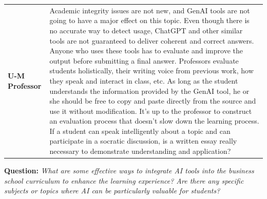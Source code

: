 \documentclass[
]{book}
\begin{document}
\begin{longtable}[]{@{}
  >{\raggedright\arraybackslash}p{}
  >{\raggedright\arraybackslash}p{}@{}}
\textbf{U-M Professor} & Academic integrity issues are not new, and GenAI tools are not going to have a major effect on this topic. Even though there is no accurate way to detect usage, ChatGPT and other similar tools are not guaranteed to deliver coherent and correct answers. Anyone who uses these tools has to evaluate and improve the output before submitting a final answer. Professors evaluate students holistically, their writing voice from previous work, how they speak and interact in class, etc. As long as the student understands the information provided by the GenAI tool, he or she should be free to copy and paste directly from the source and use it without modification. It's up to the professor to construct an evaluation process that doesn't slow down the learning process. If a student can speak intelligently about a topic and can participate in a socratic discussion, is a written essay really necessary to demonstrate understanding and application? \\
\end{longtable}

\textbf{Question:} \emph{What are some effective ways to integrate AI tools into the business school curriculum to enhance the learning experience? Are there any specific subjects or topics where AI can be particularly valuable for students?}
\end{document}
